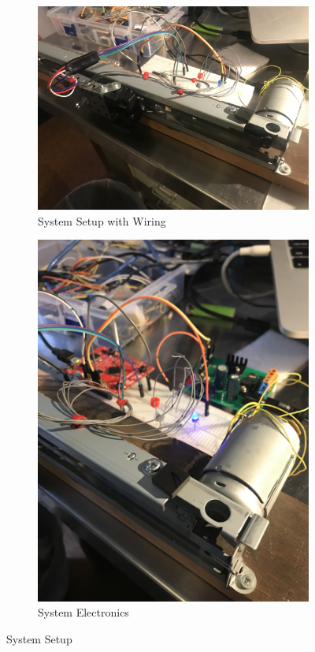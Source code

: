 \documentclass[12pt]{article}
\begin{document}
\begin{figure}[H]
\centering
\begin{subfigure}{.5\textwidth}
  \centering
  \includegraphics[width=1\linewidth]{figures/IMG_5831.jpg}
    \caption{System Setup with Wiring}
    \label{fig:wire}
\end{subfigure}%
\begin{subfigure}{.5\textwidth}
  \centering
  \includegraphics[width=1\linewidth]{figures/IMG_5848.jpg}
    \caption{System Electronics}
    \label{fig:elec}
\end{subfigure}
\caption{System Setup}
\end{figure}
\end{document}
